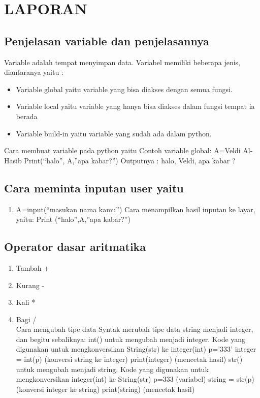 \chapter*{LAPORAN}

\section{Penjelasan variable dan penjelasannya }
\par
Variable adalah tempat menyimpan data. Variabel memiliki beberapa jenis, diantaranya yaitu :
\begin{itemize}
\item   Variable global yaitu variable yang bisa  diakses dengan semua fungsi.
\item	Variable local yaitu variable yang hanya bisa diakses dalam fungsi tempat ia berada
\item   Variable build-in yaitu variable yang sudah ada dalam python. 
\end{itemize}
Cara membuat variable pada python yaitu 
Contoh variable global:
A=Veldi Al-Hasib
Print(“halo”, A,”apa kabar?”)
Outputnya : halo, Veldi, apa kabar ?
\section{Cara meminta inputan user yaitu}
\begin{enumerate}
\item 
A=input(“masukan nama kamu”)
Cara menampilkan hasil inputan ke layar, yaitu:
Print (“halo”,A,”apa kabar?”)
\end{enumerate}
\section{Operator dasar aritmatika}
\begin{enumerate}
\item   Tambah	    	+
\item   Kurang			-
\item   Kali			*
\item   Bagi			/\\
Cara mengubah tipe data 
Syntak merubah tipe data string menjadi integer, dan begitu sebaliknya:
int() untuk mengubah menjadi integer.
Kode yang digunakan untuk mengkonversikan String(str) ke integer(int)
p=’333’
integer = int(p) (konversi string ke integer)
print(integer) (mencetak hasil)
str() untuk mengubah menjadi string.
Kode yang digunakan untuk mengkonversikan integer(int) ke String(str)
p=333 (variabel) 
string = str(p) (konversi integer ke string) 
print(string) (mencetak hasil) 
\end{enumerate}
